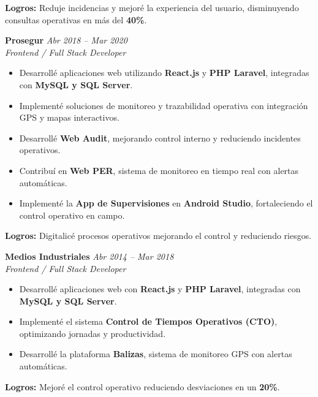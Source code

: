 \documentclass[11pt,a4paper]{article}
\begin{document}
\textbf{Logros:} Reduje incidencias y mejoré la experiencia del usuario, disminuyendo consultas operativas en más del \textbf{40\%}.

\vspace{6pt}

\textbf{Prosegur} \hfill \textit{Abr 2018 – Mar 2020}\\
\textit{Frontend / Full Stack Developer}

\begin{itemize}[leftmargin=*]
  \item Desarrollé aplicaciones web utilizando \textbf{React.js} y \textbf{PHP Laravel}, integradas con \textbf{MySQL y SQL Server}.
  \item Implementé soluciones de monitoreo y trazabilidad operativa con integración GPS y mapas interactivos.
  \item Desarrollé \textbf{Web Audit}, mejorando control interno y reduciendo incidentes operativos.
  \item Contribuí en \textbf{Web PER}, sistema de monitoreo en tiempo real con alertas automáticas.
  \item Implementé la \textbf{App de Supervisiones} en \textbf{Android Studio}, fortaleciendo el control operativo en campo.
\end{itemize}

\textbf{Logros:} Digitalicé procesos operativos mejorando el control y reduciendo riesgos.

\vspace{6pt}

\textbf{Medios Industriales} \hfill \textit{Abr 2014 – Mar 2018}\\
\textit{Frontend / Full Stack Developer}

\begin{itemize}[leftmargin=*]
  \item Desarrollé aplicaciones web con \textbf{React.js} y \textbf{PHP Laravel}, integradas con \textbf{MySQL y SQL Server}.
  \item Implementé el sistema \textbf{Control de Tiempos Operativos (CTO)}, optimizando jornadas y productividad.
  \item Desarrollé la plataforma \textbf{Balizas}, sistema de monitoreo GPS con alertas automáticas.
\end{itemize}

\textbf{Logros:} Mejoré el control operativo reduciendo desviaciones en un \textbf{20\%}.

\end{document}
